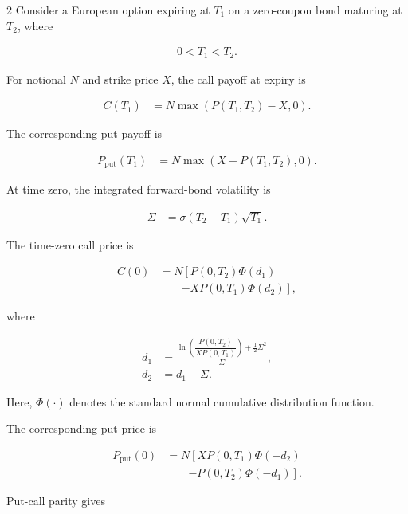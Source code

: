 \documentclass[10pt,a4paper]{article}
\numberwithin{equation}{section}
\begin{document}
\begin{multicols}{2}
Consider a European option expiring at $T_1$ on a zero-coupon bond
maturing at $T_2$, where

\begin{align*}
    0<T_1<T_2.
\end{align*}

For notional $N$ and strike price $X$, the call payoff at expiry is

\begin{align*}
    C(T_1)
    &=
    N\max(P(T_1,T_2)-X,0).
\end{align*}

The corresponding put payoff is

\begin{align*}
    P_{\mathrm{put}}(T_1)
    &=
    N\max(X-P(T_1,T_2),0).
\end{align*}

At time zero, the integrated forward-bond volatility is

\begin{align*}
    \Sigma
    &=
    \sigma(T_2-T_1)\sqrt{T_1}.
\end{align*}

The time-zero call price is

\begin{align*}
    C(0)
    &=
    N
    \left[
        P(0,T_2)\Phi(d_1)
    \right.
    \\
    &\qquad\left.
        -X P(0,T_1)\Phi(d_2)
    \right],
\end{align*}

where

\begin{align*}
    d_1
    &=
    \frac{
        \ln
        \left(
            \dfrac{P(0,T_2)}
                  {X P(0,T_1)}
        \right)
        +
        \frac{1}{2}\Sigma^2
    }{\Sigma},
    \\
    d_2
    &=
    d_1-\Sigma.
\end{align*}

Here, $\Phi(\cdot)$ denotes the standard normal cumulative distribution
function.

The corresponding put price is

\begin{align*}
    P_{\mathrm{put}}(0)
    &=
    N
    \left[
        X P(0,T_1)\Phi(-d_2)
    \right.
    \\
    &\qquad\left.
        -P(0,T_2)\Phi(-d_1)
    \right].
\end{align*}

Put-call parity gives


\end{multicols}
\end{document}
